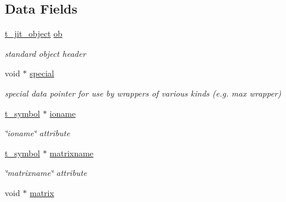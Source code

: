 \subsection*{Data Fields}
\begin{DoxyCompactItemize}
\item 
\hypertarget{structt__jit__mop__io_a25a57a2a2ecabf2c55b180d0728d24e1}{
\hyperlink{structt__object}{t\_\-jit\_\-object} \hyperlink{structt__jit__mop__io_a25a57a2a2ecabf2c55b180d0728d24e1}{ob}}
\label{structt__jit__mop__io_a25a57a2a2ecabf2c55b180d0728d24e1}

\begin{DoxyCompactList}\small\item\em standard object header \item\end{DoxyCompactList}\item 
\hypertarget{structt__jit__mop__io_a85c00aa05381ccdc644d6c71fe858acb}{
void $\ast$ \hyperlink{structt__jit__mop__io_a85c00aa05381ccdc644d6c71fe858acb}{special}}
\label{structt__jit__mop__io_a85c00aa05381ccdc644d6c71fe858acb}

\begin{DoxyCompactList}\small\item\em special data pointer for use by wrappers of various kinds (e.g. max wrapper) \item\end{DoxyCompactList}\item 
\hypertarget{structt__jit__mop__io_a50a7ba6f0cd692f4f6136e4b750fd1c2}{
\hyperlink{structt__symbol}{t\_\-symbol} $\ast$ \hyperlink{structt__jit__mop__io_a50a7ba6f0cd692f4f6136e4b750fd1c2}{ioname}}
\label{structt__jit__mop__io_a50a7ba6f0cd692f4f6136e4b750fd1c2}

\begin{DoxyCompactList}\small\item\em \char`\"{}ioname\char`\"{} attribute \item\end{DoxyCompactList}\item 
\hypertarget{structt__jit__mop__io_a95def5000493073c6de3132be4af37d2}{
\hyperlink{structt__symbol}{t\_\-symbol} $\ast$ \hyperlink{structt__jit__mop__io_a95def5000493073c6de3132be4af37d2}{matrixname}}
\label{structt__jit__mop__io_a95def5000493073c6de3132be4af37d2}

\begin{DoxyCompactList}\small\item\em \char`\"{}matrixname\char`\"{} attribute \item\end{DoxyCompactList}\item 
\hypertarget{structt__jit__mop__io_a2ed42bc96b127c9ea98f994340a611d0}{
void $\ast$ \hyperlink{structt__jit__mop__io_a2ed42bc96b127c9ea98f994340a611d0}{matrix}}
\label{structt__jit__mop__io_a2ed42bc96b127c9ea98f994340a611d0}


\end{DoxyCompactItemize}
